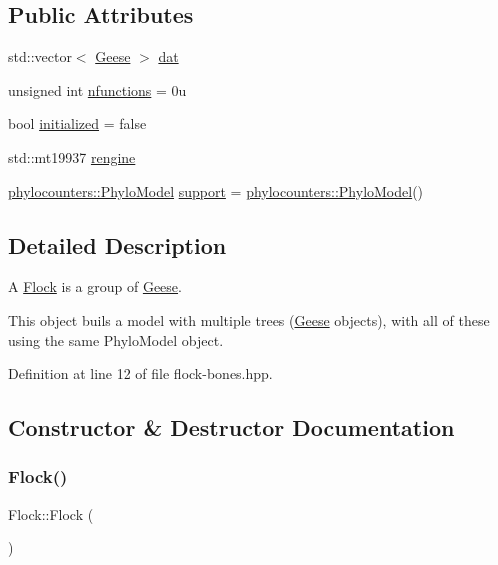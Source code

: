 \subsection*{Public Attributes}
\begin{DoxyCompactItemize}
\item 
std\+::vector$<$ \hyperlink{class_geese}{Geese} $>$ \hyperlink{class_flock_af493163235db2dcb44b8c5e615f52bdb}{dat}
\item 
unsigned int \hyperlink{class_flock_a77220682e593e9d455f56a5607981ff2}{nfunctions} = 0u
\item 
bool \hyperlink{class_flock_aad9b90040d349a23b33e09292bb964db}{initialized} = false
\item 
std\+::mt19937 \hyperlink{class_flock_a0e3ce6d007f667eea9f036cddb6789b6}{rengine}
\item 
\hyperlink{namespacebarry_1_1counters_1_1phylo_ad32b4186e3bab93119df225fddc3c609}{phylocounters\+::\+Phylo\+Model} \hyperlink{class_flock_a20d75da0d423252055af84194e88f901}{support} = \hyperlink{namespacebarry_1_1counters_1_1phylo_ad32b4186e3bab93119df225fddc3c609}{phylocounters\+::\+Phylo\+Model}()
\end{DoxyCompactItemize}


\subsection{Detailed Description}
A \hyperlink{class_flock}{Flock} is a group of \hyperlink{class_geese}{Geese}. 

This object buils a model with multiple trees (\hyperlink{class_geese}{Geese} objects), with all of these using the same Phylo\+Model object. 

Definition at line 12 of file flock-\/bones.\+hpp.



\subsection{Constructor \& Destructor Documentation}
\mbox{\label{class_flock_a2a0a514c368e21f718ad7358ed42f3b7}} 
\subsubsection{\texorpdfstring{Flock()}{Flock()}}
{\footnotesize\ttfamily Flock\+::\+Flock (\begin{DoxyParamCaption}{ }\end{DoxyParamCaption})\hspace{0.3cm}{\ttfamily [inline]}}



